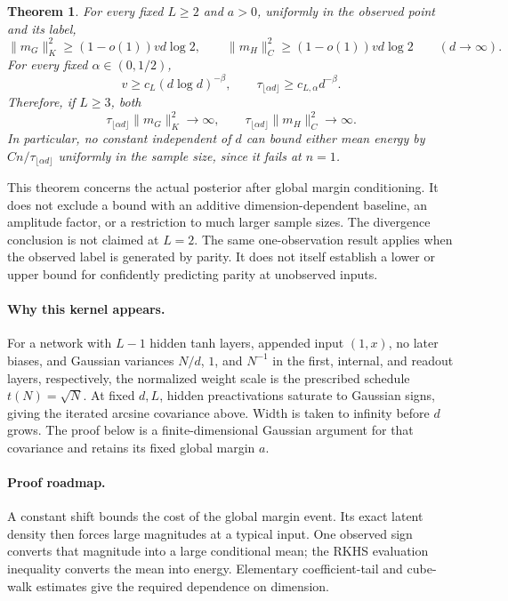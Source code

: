 \documentclass[11pt]{article}
\newtheorem{theorem}{Theorem}
\begin{document}
\begin{theorem}\label{thm:main}
For every fixed $L\ge2$ and $a>0$, uniformly in the observed point and its label,
\[
 \|m_G\|_K^2\ge(1-o(1))v d\log2,
 \qquad \|m_H\|_C^2\ge(1-o(1))v d\log2
 \qquad(d\longrightarrow\infty).
\]
For every fixed $\alpha\in(0,1/2)$,
\[
 v\ge c_L(d\log d)^{-\beta},\qquad
 \tau_{\lfloor\alpha d\rfloor}\ge c_{L,\alpha}d^{-\beta}.
\]
Therefore, if $L\ge3$, both
\[
 \tau_{\lfloor\alpha d\rfloor}\|m_G\|_K^2\longrightarrow\infty,
 \qquad
 \tau_{\lfloor\alpha d\rfloor}\|m_H\|_C^2\longrightarrow\infty.
\]
In particular, no constant independent of $d$ can bound either mean energy by $C n/\tau_{\lfloor\alpha d\rfloor}$ uniformly in the sample size, since it fails at $n=1$.
\end{theorem}

This theorem concerns the actual posterior after global margin conditioning. It does not exclude a bound with an additive dimension-dependent baseline, an amplitude factor, or a restriction to much larger sample sizes. The divergence conclusion is not claimed at $L=2$. The same one-observation result applies when the observed label is generated by parity. It does not itself establish a lower or upper bound for confidently predicting parity at unobserved inputs.

\paragraph{Why this kernel appears.}
For a network with $L-1$ hidden tanh layers, appended input $(1,x)$,
no later biases, and Gaussian variances $N/d$, $1$, and $N^{-1}$
in the first, internal, and readout layers, respectively, the normalized
weight scale is the prescribed schedule $t(N)=\sqrt N$. At fixed $d,L$,
hidden preactivations saturate to Gaussian signs, giving the iterated
arcsine covariance above. Width is taken to infinity before $d$ grows.
The proof below is a finite-dimensional Gaussian argument for that
covariance and retains its fixed global margin $a$.

\paragraph{Proof roadmap.}
A constant shift bounds the cost of the global margin event. Its exact
latent density then forces large magnitudes at a typical input. One
observed sign converts that magnitude into a large conditional mean;
the RKHS evaluation inequality converts the mean into energy. Elementary
coefficient-tail and cube-walk estimates give the required dependence
on dimension.
\end{document}
